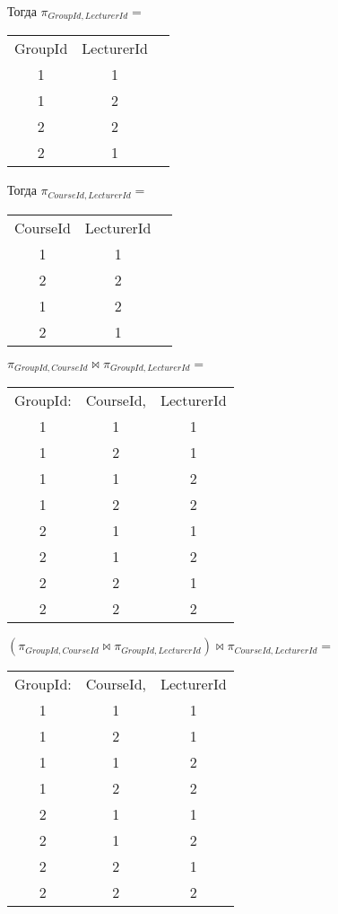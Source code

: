 \documentclass{article}
\begin{document}
	Тогда $\pi_{GroupId, LecturerId} = $
	
	\begin{center}
		\begin{tabular}{ccc}
			GroupId & LecturerId \\
			1 & 1\\
			1 & 2 \\
			2 & 2\\
			2 & 1\\
		\end{tabular}
	\end{center}

	Тогда $\pi_{CourseId, LecturerId} = $
	
	\begin{center}
		\begin{tabular}{ccc}
			CourseId & LecturerId \\
			1 & 1\\
			2 & 2 \\
			1 & 2\\
			2 & 1\\
		\end{tabular}
	\end{center}


		$\pi_{GroupId, CourseId} \bowtie \pi_{GroupId, LecturerId} =$
		
		\begin{center}
			\begin{tabular}{ccc}
				GroupId: & CourseId,& LecturerId \\
				1 & 1 & 1\\
				1 & 2& 1 \\
				1 & 1 & 2\\
				1 & 2 & 2\\
				2 & 1 & 1\\
				2 & 1 & 2\\
				2 & 2 & 1\\
				2 & 2 & 2\\
			\end{tabular}
		\end{center}
	
	$(\pi_{GroupId, CourseId} \bowtie \pi_{GroupId, LecturerId}) \bowtie  \pi_{CourseId, LecturerId} = $
	
	\begin{center}
		\begin{tabular}{ccc}
			GroupId: & CourseId,& LecturerId \\
			1 & 1 & 1\\
			1 & 2& 1 \\
			1 & 1 & 2\\
			1 & 2 & 2\\
			2 & 1 & 1\\
			2 & 1 & 2\\
			2 & 2 & 1\\
			2 & 2 & 2\\
		\end{tabular}
	\end{center}
	
\end{document}
